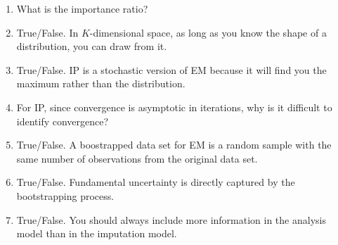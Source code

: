 \documentclass[11pt]{article}
\begin{document}
\begin{enumerate}
\item What is the importance ratio?
\item True/False. In $K$-dimensional space, as long as you know the shape of a distribution, you can draw from it. %
\item True/False. IP is a stochastic version of EM because it will find you the maximum rather than the distribution. %
\item For IP, since convergence is asymptotic in iterations, why is it difficult to identify convergence? %
\item True/False. A boostrapped data set for EM is a random sample with the same number of observations from the original data set. %
\item True/False. Fundamental uncertainty is directly captured by the bootstrapping process. %
\item True/False. You should always include more information in the analysis model than in the imputation model. %
\end{enumerate}
\end{document}

